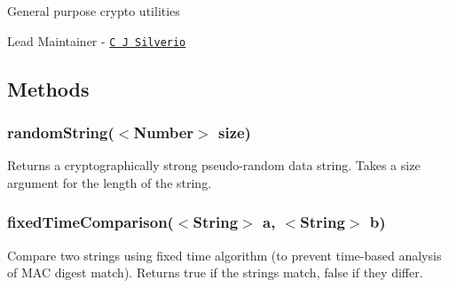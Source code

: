 General purpose crypto utilities

\href{http://travis-ci.org/hapijs/cryptiles}{\tt }

Lead Maintainer -\/ \href{https://github.com/ceejbot}{\tt C J Silverio}

\subsection*{Methods}

\subsubsection*{{\ttfamily random\+String($<$Number$>$ size)}}

Returns a cryptographically strong pseudo-\/random data string. Takes a size argument for the length of the string.

\subsubsection*{{\ttfamily fixed\+Time\+Comparison($<$String$>$ a, $<$String$>$ b)}}

Compare two strings using fixed time algorithm (to prevent time-\/based analysis of M\+AC digest match). Returns {\ttfamily true} if the strings match, {\ttfamily false} if they differ. 